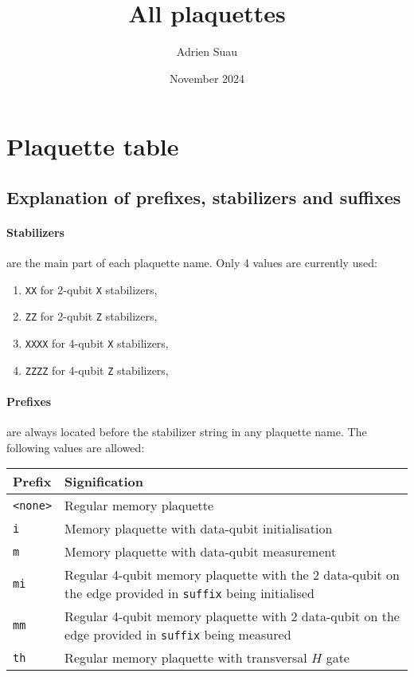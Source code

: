 \documentclass{article}
\title{All plaquettes}
\author{Adrien Suau}
\date{November 2024}
\begin{document}
\maketitle

\section{Plaquette table}

\subsection{Explanation of prefixes, stabilizers and suffixes}

\paragraph{Stabilizers} are the main part of each plaquette name. Only 4 values are currently used:

\begin{enumerate}
\item \texttt{XX} for 2-qubit \texttt{X} stabilizers,
\item \texttt{ZZ} for 2-qubit \texttt{Z} stabilizers,
\item \texttt{XXXX} for 4-qubit \texttt{X} stabilizers,
\item \texttt{ZZZZ} for 4-qubit \texttt{Z} stabilizers,
\end{enumerate}

\paragraph{Prefixes} are always located before the stabilizer string in any plaquette name.
The following values are allowed:

\begin{center}
\begin{tabular}{|l|p{}|}
    \hline
    Prefix & Signification \\
    \hline 
    \texttt{<none>} & Regular memory plaquette \\
    \hline 
    \texttt{i} & Memory plaquette with data-qubit initialisation \\
    \hline 
    \texttt{m} & Memory plaquette with data-qubit measurement \\
    \hline 
    \texttt{mi} & Regular 4-qubit memory plaquette with the 2 data-qubit on the edge provided in \texttt{suffix} being initialised \\
    \hline 
    \texttt{mm} & Regular 4-qubit memory plaquette with 2 data-qubit on the edge provided in \texttt{suffix} being measured \\
    \hline 
    \texttt{th} & Regular memory plaquette with transversal $H$ gate \\
    \hline
\end{tabular}
\end{center}
\end{document}
